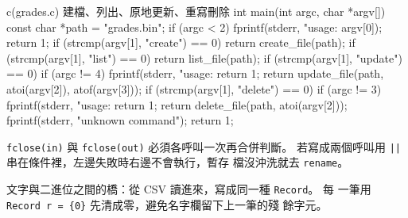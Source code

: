 \begin{example}[label=ex:fio-grades]{c}{(grades.c) 建檔、列出、原地更新、重寫刪除}
int main(int argc, char *argv[]) {
    const char *path = "grades.bin";
    if (argc < 2) {
        fprintf(stderr, "usage: %
                argv[0]);
        return 1;
    }
    if (strcmp(argv[1], "create") == 0) {
        return create_file(path);
    }
    if (strcmp(argv[1], "list") == 0) {
        return list_file(path);
    }
    if (strcmp(argv[1], "update") == 0) {
        if (argc != 4) {
            fprintf(stderr, "usage: %
            return 1;
        }
        return update_file(path, atoi(argv[2]), atof(argv[3]));
    }
    if (strcmp(argv[1], "delete") == 0) {
        if (argc != 3) {
            fprintf(stderr, "usage: %
            return 1;
        }
        return delete_file(path, atoi(argv[2]));
    }
    fprintf(stderr, "unknown command\n");
    return 1;
}
\end{example}

\texttt{fclose(in)} 與 \texttt{fclose(out)} 必須各呼叫一次再合併判斷。
若寫成兩個呼叫用 \texttt{||} 串在條件裡，左邊失敗時右邊不會執行，暫存
檔沒沖洗就去 \texttt{rename}。

文字與二進位之間的橋：從 CSV 讀進來，寫成同一種 \texttt{Record}。 每
一筆用 \texttt{Record r = \{0\}} 先清成零，避免名字欄留下上一筆的殘
餘字元。


